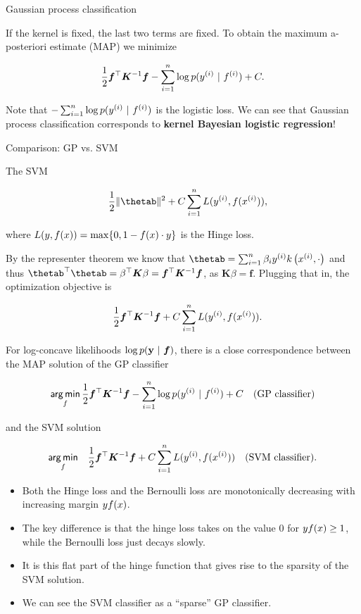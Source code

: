 \begin{vbframe}{Gaussian process classification}
\framebreak  

If the kernel is fixed, the last two terms are fixed. To obtain the maximum a-posteriori estimate (MAP) we minimize

$$
  \frac{1}{2} \bm{f}^\top \bm{K}^{-1} \bm{f} - \sum_{i=1}^n \log p(y^{(i)} ~|~ f^{(i)}) + C.
$$

Note that $- \sum_{i=1}^n \log p(y^{(i)} ~|~ f^{(i)})$
is the logistic loss. We can see that Gaussian process classification corresponds to \textbf{kernel Bayesian logistic regression}! 

\end{vbframe}

\begin{vbframe}{Comparison: GP vs. SVM }

The SVM 

\begin{eqnarray*}
  && \frac{1}{2} \|\thetab\|^2 + C \sumin \Lxyi, \\
\end{eqnarray*}

where $L(y, f(x)) = \max\{0, 1-f(x)\cdot y\}$ is the Hinge loss. 

\lz 

By the representer theorem we know that $\thetab = \sumin \beta_i \yi k\left(\xi, \cdot \right)$ and thus $\thetab^\top \thetab = \beta^\top \bm{K} \beta = \bm{f}^\top \bm{K}^{-1} \bm{f}$, as $\bm{K} \beta = \bm{f}$. Plugging that in, the optimization objective is

\begin{eqnarray*}
  && \frac{1}{2} \bm{f}^\top \bm{K}^{-1} \bm{f} + C \sum_{i=1}^n L(y^{(i)}, f(x^{(i)})). 
\end{eqnarray*}

\framebreak  

For log-concave likelihoods $\log p(\mathbf{y} ~|~ \bm{f})$, there is a close correspondence between the MAP solution of the GP classifier

$$
  \mathop{\sf arg\,min}_f \frac{1}{2} \bm{f}^\top \bm{K}^{-1} \bm{f} - \sum_{i=1}^n \log p(y^{(i)} ~|~ f^{(i)}) + C \quad \text{(GP classifier)}
$$

and the SVM solution

\begin{eqnarray*}
  \mathop{\sf arg\,min}_f && \frac{1}{2} \bm{f}^\top \bm{K}^{-1} \bm{f} + C \sum_{i=1}^n L(y^{(i)}, f(x^{(i)})) \quad \text{(SVM classifier)}. 
\end{eqnarray*}

\framebreak 

\begin{itemize}
\item Both the Hinge loss and the Bernoulli loss are monotonically decreasing with increasing margin $y f(x)$. 
\item The key difference is that the hinge loss takes on the value $0$ for $y f(x) \ge 1$, while the Bernoulli loss just decays slowly. 
\item It is this flat part of the hinge function that gives rise to the sparsity of the SVM solution. \item We can see the SVM classifier as a \enquote{sparse} GP classifier.  
\end{itemize}


\end{vbframe}
